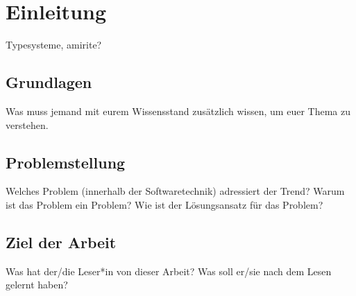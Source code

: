 \section{Einleitung} 

Typesysteme, amirite?


\subsection{Grundlagen} 
Was muss jemand mit eurem Wissensstand zusätzlich wissen, um euer Thema zu verstehen.

\subsection{Problemstellung} 
Welches Problem (innerhalb der Softwaretechnik) adressiert der Trend? Warum ist das Problem ein Problem? Wie ist der Lösungsansatz für das Problem? 

\subsection{Ziel der Arbeit} 
Was hat der/die Leser*in von dieser Arbeit? Was soll er/sie nach dem Lesen gelernt haben?
